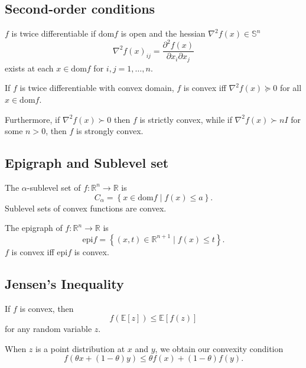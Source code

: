 \documentclass[11pt]{article}
\begin{document}
\subsection{Second-order conditions} 
$f$ is twice differentiable if $\mathrm{dom}f$ is open and the hessian $\nabla^2 f(x) \in \mathbb{S}^n$ 
\[ \nabla^2 f(x)_{ij} = \frac{\partial^2 f(x)}{\partial x_i \partial x_j} \] 
exists at each $x \in \mathrm{dom}f$ for $i,j = 1, \ldots, n$. \par 
If $f$ is twice differentiable with convex domain, $f$ is convex iff $\nabla^2 f(x) \succeq 0$ for all $x \in \mathrm{dom}f$. \par
Furthermore, if $\nabla^2 f(x) \succ 0$ then $f$ is strictly convex, while if $\nabla^2 f(x) \succ nI$ for some $n > 0$, then $f$ is strongly convex. 

\subsection{Epigraph and Sublevel set}
The $\alpha$-sublevel set of $f: \mathbb{R}^n \rightarrow \mathbb{R}$ is 
\[ C_\alpha = \left\{ x \in \mathrm{dom}f \mid f(x) \leq a \right\}. \] 
Sublevel sets of convex functions are convex. \par 
The epigraph of $f: \mathbb{R}^n \rightarrow \mathbb{R}$ is 
\[ \mathrm{epi} f = \left\{ (x, t) \in \mathbb{R}^{n+1} \mid f(x) \leq t \right\}. \] 
$f$ is convex iff $\mathrm{epi}f$ is convex. 

\subsection{Jensen's Inequality} 
If $f$ is convex, then 
\[ f(\mathbb{E}[z]) \leq \mathbb{E}[f(z)] \] 
for any random variable $z$. \par 
When $z$ is a point distribution at $x$ and $y$, we obtain our convexity condition 
\[ f(\theta x + (1-\theta) y) \leq \theta f(x) + (1-\theta)f(y). \] 
\end{document}

